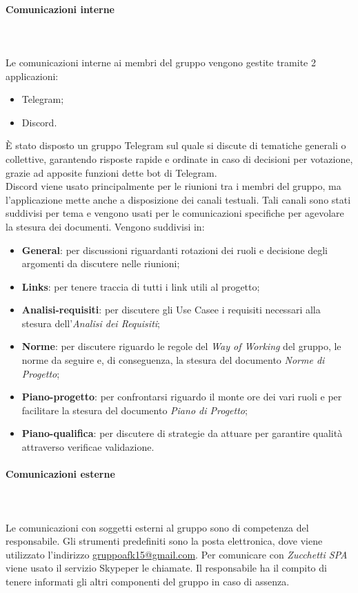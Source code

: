 \paragraph{Comunicazioni interne}\mbox{} \\ \mbox{} \\
Le comunicazioni interne ai membri del gruppo vengono gestite  tramite 2 applicazioni:
\begin{itemize}
	\item Telegram\glo;
	\item Discord\glo.
\end{itemize}
È stato disposto un gruppo Telegram sul quale si discute di tematiche generali o collettive, garantendo risposte rapide e ordinate in caso di decisioni per votazione, grazie ad apposite funzioni dette bot di Telegram\glo. \\
Discord viene usato principalmente per le riunioni tra i membri del gruppo, ma l'applicazione mette anche a disposizione dei canali testuali. Tali canali sono stati suddivisi per tema e vengono usati per le comunicazioni specifiche per agevolare la stesura dei documenti. Vengono suddivisi in:
\begin{itemize}
	\item \textbf{General}: per discussioni riguardanti rotazioni dei ruoli e decisione degli argomenti da discutere nelle riunioni;
	\item \textbf{Links}: per tenere traccia di tutti i link utili al progetto;
	\item \textbf{Analisi-requisiti}: per discutere gli Use Case\glo e i requisiti necessari alla stesura dell'\textit{Analisi dei Requisiti};
	\item \textbf{Norme}: per discutere riguardo le regole del \textit{Way of Working} del gruppo, le norme da seguire e, di conseguenza, la stesura del documento \textit{Norme di Progetto}\glo;
	\item \textbf{Piano-progetto}: per confrontarsi riguardo il monte ore dei vari ruoli e per facilitare la stesura del documento \textit{Piano di Progetto};
	\item \textbf{Piano-qualifica}: per discutere di strategie da attuare per garantire qualità attraverso verifica\glo e validazione\glo.
\end{itemize}
\paragraph{Comunicazioni esterne}\mbox{} \\ \mbox{} \\
Le comunicazioni con soggetti esterni al gruppo sono di competenza del responsabile. Gli strumenti predefiniti sono la posta elettronica, dove viene utilizzato l'indirizzo \href{mailto:gruppoafk15@gmail.com}{gruppoafk15@gmail.com}.
Per comunicare con \textit{Zucchetti SPA} viene usato il servizio Skype\glo per le chiamate. Il responsabile ha il compito di tenere informati gli altri componenti del gruppo in caso di assenza.

